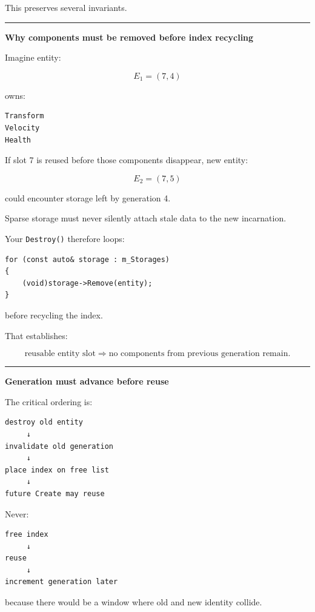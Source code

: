This preserves several invariants.

\begin{center}\rule{0.5\linewidth}{0.5pt}\end{center}

\textbf{Why components must be removed before index recycling}

Imagine entity:

\[
E_1=(7,4)
\]

owns:

\begin{verbatim}
Transform
Velocity
Health
\end{verbatim}

If slot 7 is reused before those components disappear, new entity:

\[
E_2=(7,5)
\]

could encounter storage left by generation 4.

Sparse storage must never silently attach stale data to the new incarnation.

Your \texttt{Destroy()} therefore loops:

\begin{verbatim}
for (const auto& storage : m_Storages)
{
    (void)storage->Remove(entity);
}
\end{verbatim}

before recycling the index.

That establishes:

\[
\boxed{
\text{reusable entity slot}
\Rightarrow
\text{no components from previous generation remain}.
}
\]

\begin{center}\rule{0.5\linewidth}{0.5pt}\end{center}

\textbf{Generation must advance before reuse}

The critical ordering is:

\begin{verbatim}
destroy old entity
     ↓
invalidate old generation
     ↓
place index on free list
     ↓
future Create may reuse
\end{verbatim}

Never:

\begin{verbatim}
free index
     ↓
reuse
     ↓
increment generation later
\end{verbatim}

because there would be a window where old and new identity collide.

